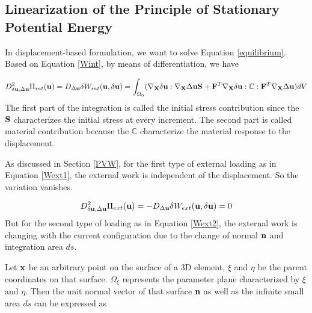 %
\subsection{Linearization of the Principle of Stationary Potential Energy}
In displacement-based formulation, we want to solve Equation \ref{equilibrium}. Based on Equation \ref{Wint}, by means of differentiation, we have

\begin{equation} \label{Kint}
D^2_{\delta\bold{u}, \Delta\bold{u}}\Pi_{int}(\bold{u}) = D_{\Delta{\bold{u}}}\delta{W_{int}}(\bold{u}, \delta{\bold{u}}) = \int_{\Omega_0}(\nabla_{\bold{X}}\delta\bold{u} : \nabla_{\bold{X}}\Delta\bold{u}\bold{S} + \bold{F}^T\nabla_{\bold{X}}\delta{\bold{u}} : \mathbb{C} : \bold{F}^T \nabla_{\bold{X}}\Delta\bold{u})dV
\end{equation}
The first part of the integration is called the initial stress contribution since the $\bold{S}$ characterizes the initial stress at every increment. The second part is called material contribution because the $\mathbb{C}$ characterize the material response to the displacement.

As discussed in Section \ref{PVW}, for the first type of external loading as in Equation \ref{Wext1}, the external work is independent of the displacement. So the variation vanishes.

\begin{equation} \label{Kext}
D^2_{\delta\bold{u}, \Delta\bold{u}}\Pi_{ext}(\bold{u}) = - D_{\Delta{\bold{u}}}\delta{W_{ext}}(\bold{u}, \delta{\bold{u}}) = 0
\end{equation}
But for the second type of loading as in Equation \ref{Wext2}, the external work is changing with the current configuration due to the change of normal $\bold{n}$ and integration area $ds$. 

Let $\bold{x}$ be an arbitrary point on the surface of a 3D element, $\xi$ and $\eta$ be the parent coordinates on that surface. $\Omega_{\xi}$ represents the parameter plane characterized by $\xi$ and $\eta$. Then the unit normal vector of that surface $\bold{n}$ as well as the infinite small area $ds$ can be expressed as

